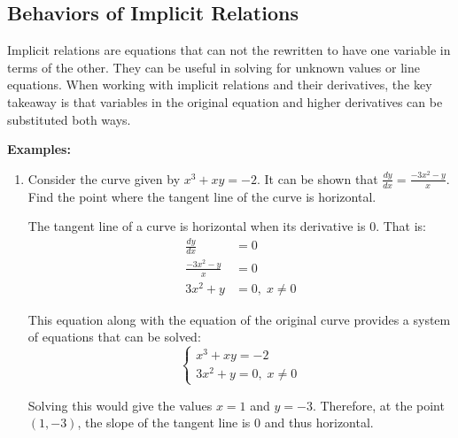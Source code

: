 \documentclass[12pt]{article}
\begin{document}
\subsection{Behaviors of Implicit Relations}
Implicit relations are equations that can not the rewritten to have one variable in terms of the other. They can be useful in solving for unknown values or line equations. When working with implicit relations and their derivatives, the key takeaway is that variables in the original equation and higher derivatives can be substituted both ways.

\noindent \textbf{Examples:}
\begin{enumerate}
	\item Consider the curve given by $x^3 + xy = -2$. It can be shown that $\frac{dy}{dx} = \frac{-3x^2 - y}{x}$. Find the point where the tangent line of the curve is horizontal.

	The tangent line of a curve is horizontal when its derivative is $0$. That is:
	\begin{align*}
		\frac{dy}{dx} &= 0 \\[5pt]
		\frac{-3x^2 - y}{x} &= 0 \\[5pt]
		3x^2 + y &= 0 , \; x \neq 0
	\end{align*}

	This equation along with the equation of the original curve provides a system of equations that can be solved:
	\[ \begin{cases}
		x^3 + xy = -2 \\
		3x^2 + y = 0 , \; x \neq 0
	\end{cases} \]

	Solving this would give the values $x = 1$ and $y = -3$. Therefore, at the point $(1, -3)$, the slope of the tangent line is $0$ and thus horizontal.
\end{enumerate}
\end{document}
